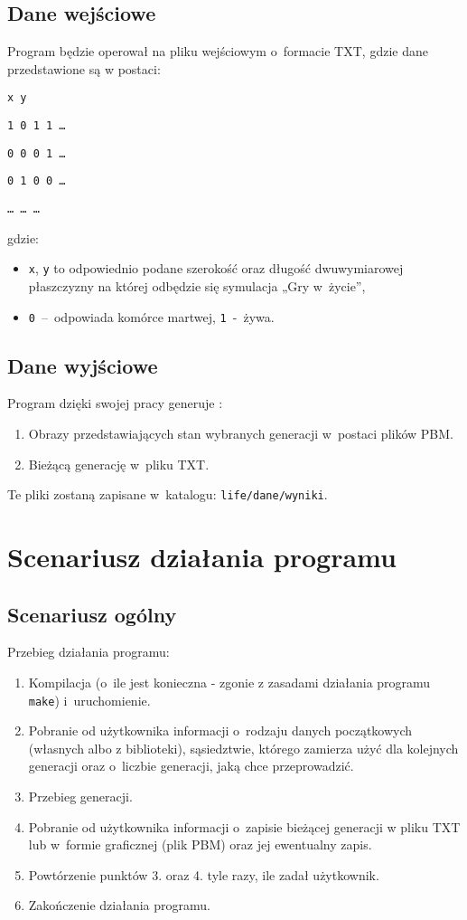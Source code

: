 \documentclass[a4paper,12pt,oneside]{article}
\begin{document}
\subsection{Dane wejściowe}

Program będzie operował na pliku wejściowym o~formacie TXT, gdzie dane przedstawione są w postaci:\newline
\par \verb+x y+
\par \verb+1 0 1 1 …+
\par \verb+0 0 0 1 …+
\par \verb+0 1 0 0 …+
\par \verb+… … … +\newline
\par gdzie:
\begin{itemize}
\item \verb+x+, \verb+y+ to odpowiednio podane szerokość oraz długość dwuwymiarowej płaszczyzny na której odbędzie się symulacja „Gry w~życie”,
\item \verb+0+~–~odpowiada komórce martwej, \verb+1+~-~żywa.
\end{itemize}


\subsection{Dane wyjściowe}

Program dzięki swojej pracy generuje :\begin{enumerate}
\item Obrazy przedstawiających stan wybranych generacji w~postaci plików PBM.
\item Bieżącą generację w~pliku TXT.
\end{enumerate}
\par Te pliki zostaną zapisane w~katalogu: \verb+life/dane/wyniki+.

\section{Scenariusz działania programu}
\subsection{Scenariusz ogólny}
Przebieg działania programu:
\begin{enumerate}
\item Kompilacja (o~ile jest konieczna - zgonie z zasadami działania programu \verb+make+) i~uruchomienie.
\item Pobranie od użytkownika informacji o~rodzaju danych początkowych (własnych albo z biblioteki), sąsiedztwie, którego zamierza użyć dla kolejnych generacji oraz o~liczbie generacji, jaką chce przeprowadzić.
\item Przebieg generacji.
\item Pobranie od użytkownika informacji o~zapisie bieżącej generacji w pliku TXT lub w~formie graficznej (plik PBM) oraz jej ewentualny zapis.
\item Powtórzenie punktów 3. oraz 4. tyle razy, ile zadał użytkownik.
\item Zakończenie działania programu.
\end{enumerate}
\end{document}
